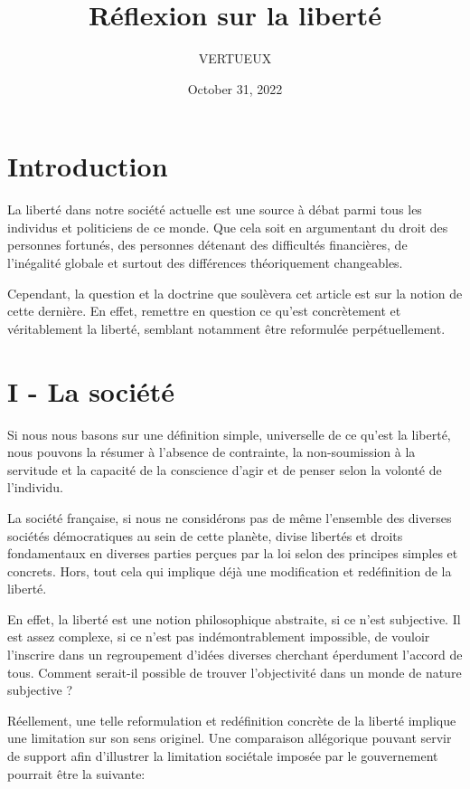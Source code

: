 \documentclass[]{cls/tools}
\begin{document}
\title{Réflexion sur la liberté}

\author{VERTUEUX}
\date{October 31, 2022}

\maketitle

\section*{Introduction}
La liberté dans notre société actuelle est une source à débat parmi tous les individus et politiciens de ce monde. Que cela soit en 
argumentant du droit des personnes fortunés, des personnes détenant des difficultés financières, de l'inégalité globale et surtout 
des différences théoriquement changeables. 

Cependant, la question et la doctrine que soulèvera cet article est sur la notion de cette dernière. En effet, remettre en question 
ce qu'est concrètement et véritablement la liberté, semblant notamment être reformulée perpétuellement.

\section*{I - La société}
Si nous nous basons sur une définition simple, universelle de ce qu'est la liberté, nous 
pouvons la résumer à l'absence de contrainte, la non-soumission à la servitude et la capacité 
de la conscience d'agir et de penser selon la volonté de l'individu.\newline

La société française, si nous ne considérons pas de même l'ensemble des diverses sociétés démocratiques au sein de cette planète,
divise libertés et droits fondamentaux en diverses parties perçues par la loi selon des principes simples
et concrets. Hors, tout cela qui implique déjà une modification et redéfinition de la liberté. 

En effet, la liberté est une notion philosophique abstraite, si ce n'est subjective. Il est assez complexe,
si ce n'est pas indémontrablement impossible, de vouloir l'inscrire dans un regroupement d'idées diverses 
cherchant éperdument l'accord de tous. Comment serait-il possible de trouver l'objectivité dans un monde de nature subjective ?

Réellement, une telle reformulation et redéfinition concrète de la liberté implique une limitation sur son sens originel.
Une comparaison allégorique pouvant servir de support afin d'illustrer la limitation sociétale imposée par le gouvernement pourrait être la suivante:\newline
\end{document}
